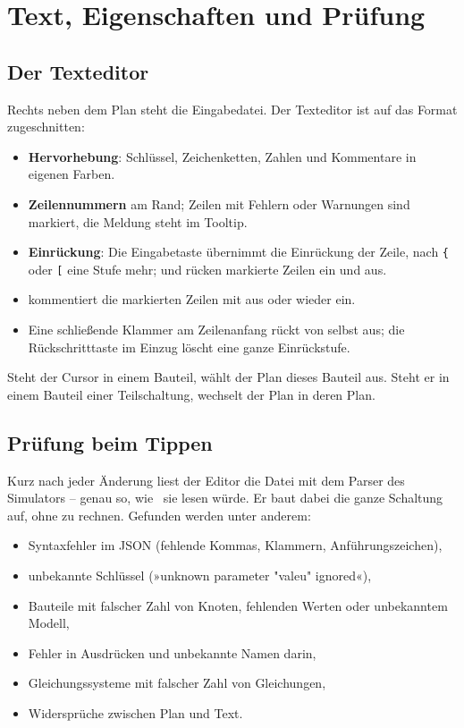 \chapter{Text, Eigenschaften und Prüfung}
\label{kap:editor-text}

\section{Der Texteditor}

Rechts neben dem Plan steht die Eingabedatei. Der Texteditor ist auf das
Format zugeschnitten:

\begin{itemize}
  \item \textbf{Hervorhebung}: Schlüssel, Zeichenketten, Zahlen und
    Kommentare in eigenen Farben.
  \item \textbf{Zeilennummern} am Rand; Zeilen mit Fehlern oder Warnungen
    sind markiert, die Meldung steht im Tooltip.
  \item \textbf{Einrückung}: Die Eingabetaste übernimmt die Einrückung der
    Zeile, nach \texttt{\{} oder \texttt{[} eine Stufe mehr;  und  rücken markierte Zeilen ein
    und aus.
  \item {} kommentiert die markierten Zeilen mit \code{//}
    aus oder wieder ein.
  \item Eine schließende Klammer am Zeilenanfang rückt von selbst aus;
    die Rückschritttaste im Einzug löscht eine ganze Einrückstufe.
\end{itemize}

Steht der Cursor in einem Bauteil, wählt der Plan dieses Bauteil aus. Steht
er in einem Bauteil einer Teilschaltung, wechselt der Plan in deren Plan.

\section{Prüfung beim Tippen}

Kurz nach jeder Änderung liest der Editor die Datei mit dem Parser des
Simulators – genau so, wie \esim\ sie lesen würde. Er baut dabei die ganze
Schaltung auf, ohne zu rechnen. Gefunden werden unter anderem:

\begin{itemize}
  \item Syntaxfehler im JSON (fehlende Kommas, Klammern, Anführungszeichen),
  \item unbekannte Schlüssel (»unknown parameter "valeu" ignored«),
  \item Bauteile mit falscher Zahl von Knoten, fehlenden Werten oder
    unbekanntem Modell,
  \item Fehler in Ausdrücken und unbekannte Namen darin,
  \item Gleichungssysteme mit falscher Zahl von Gleichungen,
  \item Widersprüche zwischen Plan und Text.
\end{itemize}

